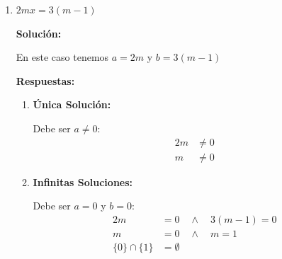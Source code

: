 \documentclass[12pt]{article}
\newcommand{\solucion}{%
    \vspace{0.8em}%
    \textbf{Solución:}%
}
\begin{document}
\begin{enumerate}[label=\roman*)]
\begin{enumerate}[label=\alph*)]
    \newpage
    \item \textbf{Ninguna Solución:}

    Para que el conjunto vacío sea solución debe ser $a = 0$ y $b \neq 0$:
    \begin{align*}
    m^2 - 4 &= 0 \quad \land \quad m - 2 \neq 0 \\
    m &= \pm 2 \quad \land \quad m \neq 2 \\
    m &= -2
    \end{align*}

    \item \textbf{Solución $x = 4$:}
    Para tener como solución única debe ser:
    \begin{align*}
    x &= \dfrac{b}{a} = \dfrac{m - 2}{m^2 - 4} = 4
    \end{align*}

    Observando que $m^2 - 4 = (m + 2)(m - 2)$, tenemos:
    \begin{align*}
    \dfrac{m - 2}{(m + 2)(m - 2)} &= 4 \\[0.3em]
    \dfrac{1}{m + 2} &= 4 \\[0.3em]
    1 &= 4m + 8 \\[0.3em]
    -7 &= 4m \\[0.3em]
    m &= -\dfrac{7}{4}
    \end{align*}

    Por lo tanto: $\boxed{m = -\dfrac{7}{4}}$
    \end{enumerate}

    \item $2mx = 3(m - 1)$

    \solucion

    En este caso tenemos $a = 2m$ y $b = 3(m - 1)$

    \textbf{Respuestas:}

    \begin{enumerate}[label=\alph*)]
    \item \textbf{Única Solución:}

    Debe ser $a \neq 0$:
    \begin{align*}
    2m &\neq 0 \\
    m &\neq 0
    \end{align*}

    \newpage
    \item \textbf{Infinitas Soluciones:}

    Debe ser $a = 0$ y $b = 0$:
    \begin{align*}
    2m &= 0 \quad \land \quad 3(m - 1) = 0 \\
    m &= 0 \quad \land \quad m = 1 \\
    \{0\} \cap \{1\} &= \emptyset
    \end{align*}


\end{enumerate}
\end{enumerate}
\end{document}
